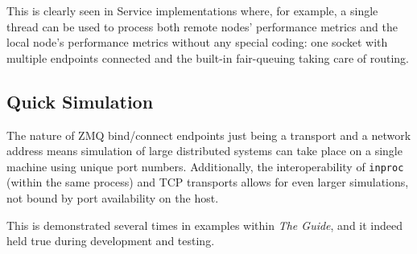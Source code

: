 This is clearly seen in \dcamp Service implementations where, for example, a single thread can be used to process both
remote nodes' performance metrics and the local node's performance metrics without any special coding: one socket with
multiple endpoints connected and the built-in fair-queuing taking care of routing.

\subsection{Quick Simulation}

The nature of ZMQ bind/connect endpoints just being a transport and a network address means simulation of large
distributed systems can take place on a single machine using unique port numbers. Additionally, the interoperability of
\texttt{inproc} (within the same process) and TCP transports allows for even larger simulations, not bound by port
availability on the host.

This is demonstrated several times in examples within \textit{The Guide}, and it indeed held true during \dcamp
development and testing.
